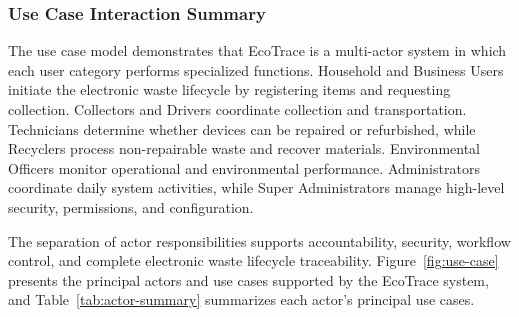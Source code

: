 \subsubsection{Use Case Interaction Summary}

The use case model demonstrates that EcoTrace is a multi-actor system in
which each user category performs specialized functions. Household and
Business Users initiate the electronic waste lifecycle by registering items and
requesting collection. Collectors and Drivers coordinate collection and
transportation. Technicians determine whether devices can be repaired or
refurbished, while Recyclers process non-repairable waste and recover
materials. Environmental Officers monitor operational and environmental
performance. Administrators coordinate daily system activities, while Super
Administrators manage high-level security, permissions, and configuration.

The separation of actor responsibilities supports accountability, security,
workflow control, and complete electronic waste lifecycle traceability.
Figure~\ref{fig:use-case} presents the principal actors and use cases supported
by the EcoTrace system, and Table~\ref{tab:actor-summary} summarizes each
actor's principal use cases.

